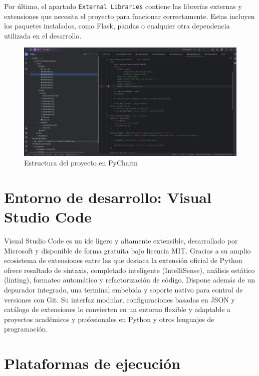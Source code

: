 \documentclass[a4paper, 12pt]{book}
\begin{document}
Por último, el apartado \texttt{External Libraries} contiene las librerías externas y extensiones que necesita el proyecto para funcionar correctamente. Estas incluyen los paquetes instalados, como Flask, pandas o cualquier otra dependencia utilizada en el desarrollo.

\begin{figure}[h!]
    \centering
    \includegraphics[width=1.1\textwidth]{img/pycharm.png}
    \caption{Estructura del proyecto en PyCharm}
    \label{fig:pycharm_project}
\end{figure}


\section{Entorno de desarrollo: Visual Studio Code}
\label{sec:entorno_de_desarrollo_vscode}

Visual Studio Code es un \gls{ide} ligero y altamente extensible, desarrollado por Microsoft y disponible de forma gratuita bajo licencia MIT. Gracias a su amplio ecosistema de extensiones entre las que destaca la extensión oficial de Python ofrece resaltado de sintaxis, completado inteligente (IntelliSense), análisis estático (linting), formateo automático y refactorización de código. Dispone además de un depurador integrado, una terminal embebida y soporte nativo para control de versiones con Git. Su interfaz modular, configuraciones basadas en JSON y catálogo de extensiones lo convierten en un entorno flexible y adaptable a proyectos académicos y profesionales en Python y otros lenguajes de programación.  

\section{Plataformas de ejecución}
\label{sec:plataformas_de_ejecucion}
\end{document}
